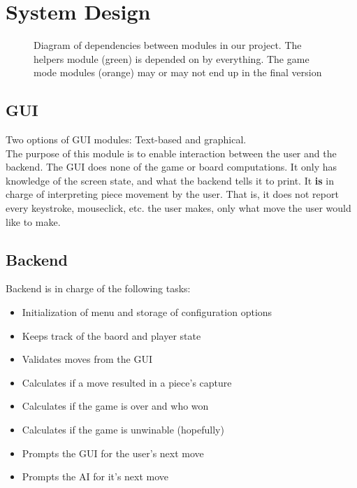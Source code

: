 \documentclass[11pt, oneside]{article}
\begin{document}
\section{System Design}
\begin{figure}[H]\label{fig:MDD}
  \centering
  \caption{Diagram of dependencies between modules in our project. The helpers
    module (green) is depended on by everything. The game mode modules (orange)
    may or may not end up in the final version}
\end{figure}

\subsection{GUI}
Two options of GUI modules: Text-based and graphical.\\
The purpose of this module is to enable interaction between the user and the
backend. The GUI does none of the game or board computations. It only has
knowledge of the screen state, and what the backend tells it to print. It
\textbf{is} in charge of interpreting piece movement by the user. That is, it
does not report every keystroke, mouseclick, etc. the user makes, only what move
the user would like to make.

\subsection{Backend}
Backend is in charge of the following tasks:
\begin{itemize}
\item Initialization of menu and storage of configuration options
\item Keeps track of the baord and player state
\item Validates moves from the GUI
\item Calculates if a move resulted in a piece's capture
\item Calculates if the game is over and who won
\item Calculates if the game is unwinable (hopefully)
\item Prompts the GUI for the user's next move
\item Prompts the AI for it's next move
\end{itemize}
\end{document}
